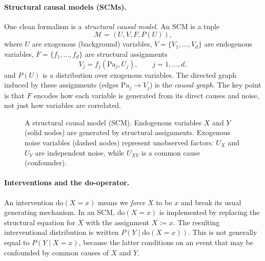 \documentclass{article}
\providecommand{\do}{\mathrm{do}}
\begin{document}
\paragraph{Structural causal models (SCMs).}
One clean formalism is a \emph{structural causal model}. An SCM is a tuple
\[
\mathcal{M} = (U, V, F, P(U)),
\]
where \(U\) are exogenous (background) variables, \(V=\{V_1,\dots,V_d\}\) are endogenous variables, \(F=\{f_1,\dots,f_d\}\) are structural assignments
\[
V_j = f_j(\mathrm{Pa}_j, U_j), \qquad j=1,\dots,d,
\]
and \(P(U)\) is a distribution over exogenous variables. The directed graph induced by these assignments (edges \(\mathrm{Pa}_j \to V_j\)) is the \emph{causal graph}. The key point is that \(F\) encodes how each variable is generated from its direct causes and noise, not just how variables are correlated.


\begin{figure}[htbp]
\centering
{}
\caption{A structural causal model (SCM). Endogenous variables $X$ and $Y$ (solid nodes) are generated by structural assignments. Exogenous noise variables (dashed nodes) represent unobserved factors: $U_X$ and $U_Y$ are independent noise, while $U_{XY}$ is a common cause (confounder).}
\label{fig:scm}
\end{figure}

\paragraph{Interventions and the do-operator.}
An intervention \(\do(X=x)\) means we \emph{force} \(X\) to be \(x\) and break its usual generating mechanism. In an SCM, \(\do(X=x)\) is implemented by replacing the structural equation for \(X\) with the assignment \(X:=x\). The resulting interventional distribution is written \(P(Y \mid \do(X=x))\). This is not generally equal to \(P(Y \mid X=x)\), because the latter conditions on an event that may be confounded by common causes of \(X\) and \(Y\).
\end{document}
